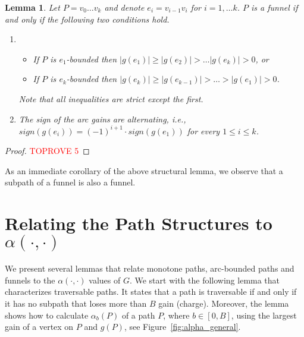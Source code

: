 \documentclass[11pt]{article}
\newtheorem{lemma}[theorem]{Lemma}
\begin{document}
\begin{lemma}\label{lemma:funnel-zigzag-structure}
    Let $P = v_0 \ldots v_k$ and denote $e_i =  v_{i-1}v_i$ for $i=1,\ldots k$.  $P$ is a funnel if and only if the following two conditions hold.
    \begin{enumerate}
        \item 
        \begin{itemize}
        \item If $P$ is $e_1$-bounded then $|g(e_1)|\ge|g(e_2)| > \ldots |g(e_{k})|>0$, or
        \item If $P$ is $e_{k}$-bounded then $|g(e_{k})| \ge |g(e_{k-1})| > \ldots > |g(e_1)| > 0$.
    \end{itemize}
    Note that all inequalities are strict except the first.
    \item The sign of the arc gains are alternating, i.e., $sign(g(e_i)) = (-1)^{i+1}\cdot sign(g(e_1))$ for
    every $1\le i \le k$.
    \end{enumerate}
\end{lemma}

\begin{proof}\textcolor{red}{TOPROVE 5}\end{proof}

As an immediate corollary of the above structural lemma, we observe that a subpath of a funnel is also a funnel.


\section{Relating the Path Structures to \texorpdfstring{$\alpha(\cdot, \cdot)$}{Alpha(.,.)}}
We present several lemmas that relate monotone paths, arc-bounded paths and funnels to the $\alpha(\cdot,\cdot)$ values of $G$. We start with the following lemma that characterizes traversable paths. It states that a path is traversable if and only if it has no subpath that loses more than $B$ gain (charge). Moreover, the lemma shows how to calculate $\alpha_b(P)$ of a path $P$, where $b\in [0,B]$, using the largest gain of a vertex on $P$ and $g(P)$, see Figure~\ref{fig:alpha_general}.
\end{document}
